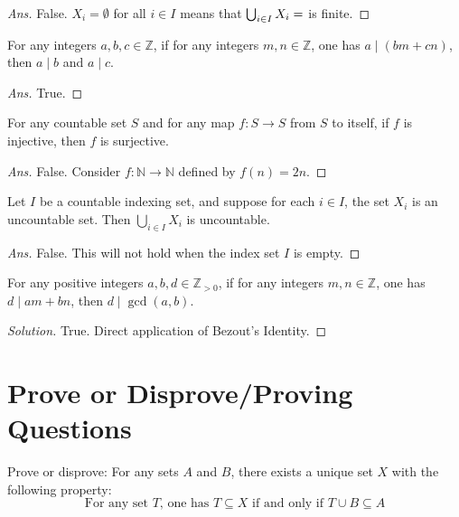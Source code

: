 \documentclass[12pt]{article}
\newenvironment{problem}[2][Problem]{\begin{trivlist}
\item[\hskip \labelsep {\bfseries #1}\hskip \labelsep {\bfseries #2.}]}{\end{trivlist}}
\begin{document}
\begin{proof}[Ans]
False. $X_i = \emptyset$ for all $i \in I$ means that $\bigcup_{i \in I} X_i = \empty$ is finite.
\end{proof}

\begin{problem}{57}
For any integers $a, b, c \in \mathbb{Z}$, if for any integers $m, n \in \mathbb{Z}$, one has $a \mid (bm + cn)$, then $a \mid b$ and $a \mid c$.
\end{problem}

\begin{proof}[Ans]
True.
\end{proof}

\begin{problem}{58}
For any countable set $S$ and for any map $f : S \rightarrow S$ from $S$ to itself, if $f$ is injective, then $f$ is surjective.
\end{problem}

\begin{proof}[Ans]
False. Consider $f : \mathbb{N} \to \mathbb{N}$ defined by $f(n) = 2n$.
\end{proof}

\begin{problem}{59}
Let $I$ be a countable indexing set, and suppose for each $i \in I$, the set $X_i$ is an uncountable set. Then $\bigcup_{i \in I} X_i$ is uncountable.
\end{problem}

\begin{proof}[Ans]
False. This will not hold when the index set $I$ is empty.
\end{proof}

\begin{problem}{60}
For any positive integers $a, b, d \in \mathbb{Z}_{>0}$, if for any integers $m,n \in \mathbb{Z}$, one has $d \mid am+ bn$, then $d \mid \gcd(a, b)$.
\end{problem}

\begin{proof}[Solution]
True. Direct application of Bezout's Identity.
\end{proof}
\newpage

\section{Prove or Disprove/Proving Questions}

\begin{problem}{1}[10 points] Prove or disprove: For any sets $A$ and $B$, there exists a unique set $X$ with the following property:
\[\text{For any set }T\text{, one has  } T \subseteq X \text{  if and only if   } T \cup B \subseteq A\]

\end{problem}
\end{document}
